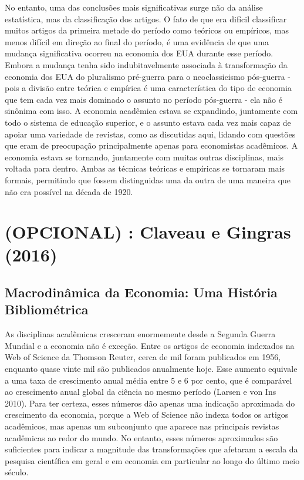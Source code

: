 \documentclass[12pt]{article}
\begin{document}
No entanto, uma das conclusões mais significativas surge não da análise estatística, mas da classificação dos artigos. O fato de que era difícil classificar muitos artigos da primeira metade do período como teóricos ou empíricos, mas menos difícil em direção ao final do período, é uma evidência de que uma mudança significativa ocorreu na economia dos EUA durante esse período. Embora a mudança tenha sido indubitavelmente associada à transformação da economia dos EUA do pluralismo pré-guerra para o neoclassicismo pós-guerra - pois a divisão entre teórica e empírica é uma característica do tipo de economia que tem cada vez mais dominado o assunto no período pós-guerra - ela não é sinônima com isso. A economia acadêmica estava se expandindo, juntamente com todo o sistema de educação superior, e o assunto estava cada vez mais capaz de apoiar uma variedade de revistas, como as discutidas aqui, lidando com questões que eram de preocupação principalmente apenas para economistas acadêmicos. A economia estava se tornando, juntamente com muitas outras disciplinas, mais voltada para dentro. Ambas as técnicas teóricas e empíricas se tornaram mais formais, permitindo que fossem distinguidas uma da outra de uma maneira que não era possível na década de 1920.


\section{\textbf{(OPCIONAL) : Claveau e Gingras (2016)}}
\subsection{\textbf{Macrodinâmica da Economia: Uma História Bibliométrica}}
As disciplinas acadêmicas cresceram enormemente desde a Segunda Guerra Mundial e a economia não é exceção. Entre os artigos de economia indexados na Web of Science da Thomson Reuter, cerca de mil foram publicados em 1956, enquanto quase vinte mil são publicados anualmente hoje. Esse aumento equivale a uma taxa de crescimento anual média entre 5 e 6 por cento, que é comparável ao crescimento anual global da ciência no mesmo período (Larsen e von Ins 2010). Para ter certeza, esses números dão apenas uma indicação aproximada do crescimento da economia, porque a Web of Science não indexa todos os artigos acadêmicos, mas apenas um subconjunto que aparece nas principais revistas acadêmicas ao redor do mundo. No entanto, esses números aproximados são suficientes para indicar a magnitude das transformações que afetaram a escala da pesquisa científica em geral e em economia em particular ao longo do último meio século.
\end{document}
